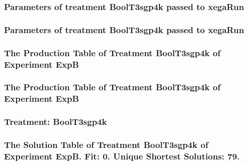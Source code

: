 \documentclass[18pt,c]{beamer}
\begin{document}

 \begin{frame}
 \fontsize{8pt}{9pt}\selectfont
 \frametitle{  Parameters of treatment BoolT3sgp4k passed to xegaRun
 }

 \label{ExpBtParmTable070.tex}  
 \end{frame}


 \begin{frame}
 \fontsize{8pt}{9pt}\selectfont
 \frametitle{  Parameters of treatment BoolT3sgp4k passed to xegaRun
 }

 \label{ExpBtParmTable071.tex}  
 \end{frame}

 \begin{frame}
 \fontsize{8pt}{9pt}\selectfont
 \frametitle{ The Production Table of Treatment BoolT3sgp4k of Experiment ExpB }

 \label{ExpBGrammarTable020.tex}  
 \end{frame}

 \begin{frame}
 \fontsize{8pt}{9pt}\selectfont
 \frametitle{ The Production Table of Treatment BoolT3sgp4k of Experiment ExpB }

 \label{ExpBGrammarTable021.tex}  
 \end{frame}

 \begin{frame}
 \fontsize{8pt}{9pt}\selectfont
 \frametitle{ Treatment: BoolT3sgp4k }

 \label{ExpBStatsTable024.tex}  
 \end{frame}

 \begin{frame}
 \fontsize{8pt}{9pt}\selectfont
 \frametitle{ The Solution Table of Treatment BoolT3sgp4k of Experiment ExpB. Fit: 0. Unique Shortest Solutions: 79. }

 \label{ExpBSolutionTable017.tex}  
 \end{frame}
\end{document}
